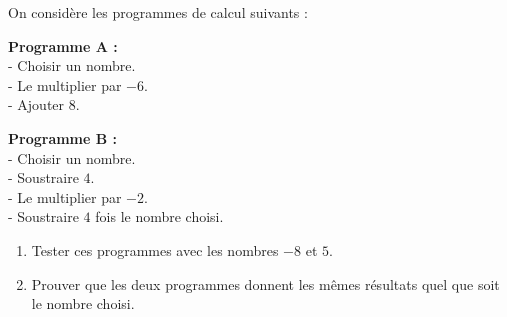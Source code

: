 \documentclass[11pt]{article}
\begin{document}
\begin{exercicedevoir}[1]

On considère les programmes de calcul suivants :

\medskip

\textbf{Programme A :}\\
- Choisir un nombre.\\- Le multiplier par $-6$.\\- Ajouter $8$.

\medskip

\textbf{Programme B :}\\
- Choisir un nombre.\\- Soustraire $4$.\\- Le multiplier par $-2$.\\- Soustraire $4$ fois le nombre choisi.

\medskip

\begin{enumerate}[label=\alph*)]
\item Tester ces programmes avec les nombres $-8$ et $5$.\\
\item Prouver que les deux programmes donnent les mêmes résultats quel que soit le nombre choisi.

\medskip

\end{enumerate}
\end{exercicedevoir}
\end{document}
